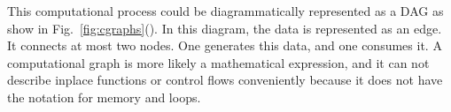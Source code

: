 \documentclass[aps,twocolumn,longbibliography,english,superscriptaddress]{revtex4-1}
\newcommand{\<}{\langle}
\renewcommand{\>}{\rangle}
\newcommand{\Fig}[1]{Fig.~\ref{#1}}
\theoremstyle{definition}\newtheorem{definition}{\textit{Definition}}
\begin{document}
This computational process could be diagrammatically represented as a DAG as show in \Fig{fig:cgraphs}().
In this diagram, the data is represented as an edge. It connects at most two nodes. One generates this data, and one consumes it.
A computational graph is more likely a mathematical expression, and it can not describe inplace functions or control flows conveniently because it does not have the notation for memory and loops.
\end{document}
